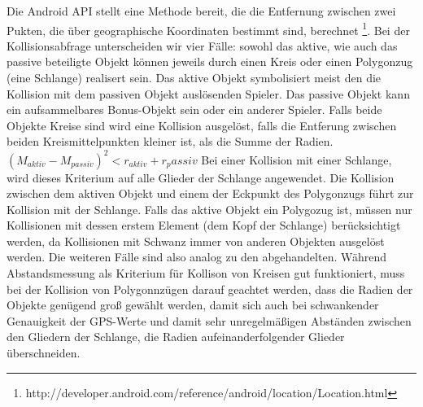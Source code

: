 Die Android API stellt eine Methode bereit, die die Entfernung zwischen zwei Pukten, die über geographische Koordinaten bestimmt sind, berechnet \footnote{http://developer.android.com/reference/android/location/Location.html}.
Bei der Kollisionsabfrage unterscheiden wir vier Fälle: sowohl das aktive, wie auch das passive beteiligte Objekt können jeweils durch einen Kreis oder einen Polygonzug (eine Schlange) realisert sein.
Das aktive Objekt symbolisiert meist den die Kollision mit dem passiven Objekt auslösenden Spieler.
Das passive Objekt kann ein aufsammelbares Bonus-Objekt sein oder ein anderer Spieler.
Falls beide Objekte Kreise sind wird eine Kollision ausgelöst, falls die Entferung zwischen beiden Kreismittelpunkten kleiner ist, als die Summe der Radien.
$(M_{aktiv}-M_{passiv})^2<r_{aktiv}+{r_passiv}$
Bei einer Kollision mit einer Schlange, wird dieses Kriterium auf alle Glieder der Schlange angewendet. Die Kollision zwischen dem aktiven Objekt und einem der Eckpunkt des Polygonzugs führt zur Kollision mit der Schlange. 
Falls das aktive Objekt ein Polygozug ist, müssen nur Kollisionen mit dessen erstem Element (dem Kopf der Schlange) berücksichtigt werden, da Kollisionen mit Schwanz immer von anderen Objekten ausgelöst werden. Die weiteren Fälle sind also analog zu den abgehandelten.
Während Abstandsmessung als Kriterium für Kollison von Kreisen gut funktioniert, muss bei der Kollision von Polygonnzügen darauf geachtet werden, dass die Radien der Objekte genügend groß gewählt werden, damit sich auch bei schwankender Genauigkeit der GPS-Werte und damit sehr unregelmäßigen Abständen zwischen den Gliedern der Schlange, die Radien aufeinanderfolgender Glieder überschneiden.
